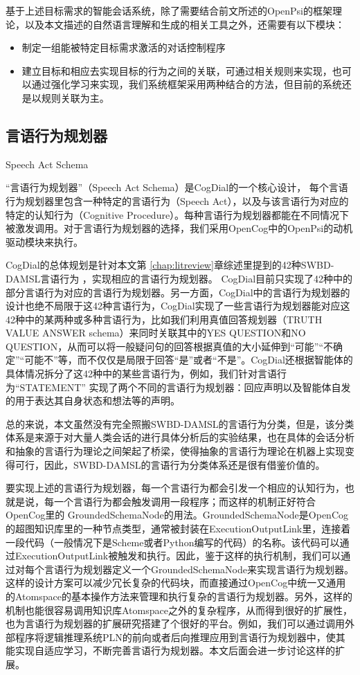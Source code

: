 基于上述目标需求的智能会话系统，除了需要结合前文所述的OpenPsi的框架理论，以及本文描述的自然语言理解和生成的相关工具之外，还需要有以下模块：
\begin{itemize}
\item 制定一组能被特定目标需求激活的对话控制程序
\item 建立目标和相应去实现目标的行为之间的关联，可通过相关规则来实现，也可以通过强化学习来实现，我们系统框架采用两种结合的方法，但目前的系统还是以规则关联为主。
\end{itemize}
  

\subsection {言语行为规划器}{Speech Act Schema}
\label{sec:SAS}

“言语行为规划器”（Speech Act Schema）是CogDial的一个核心设计， 每个言语行为规划器里包含一种特定的言语行为（Speech Act），以及与该言语行为对应的特定的认知行为（Cognitive Procedure）。每种言语行为规划器都能在不同情况下被激发调用。对于言语行为规划器的选择，我们采用OpenCog中的OpenPsi的动机驱动模块来执行。

    CogDial的总体规划是针对本文第 \ref{chap:litreview}章综述里提到的42种SWBD-DAMSL言语行为 \cite{Twitchell2004}，实现相应的言语行为规划器。 CogDial目前只实现了42种中的部分言语行为对应的言语行为规划器。另一方面，CogDial中的言语行为规划器的设计也绝不局限于这42种言语行为，CogDial实现了一些言语行为规划器能对应这42种中的某两种或多种言语行为，比如我们利用真值回答规划器（TRUTH VALUE ANSWER schema）来同时关联其中的YES QUESTION和NO QUESTION，从而可以将一般疑问句的回答根据真值的大小延伸到“可能”“不确定”“可能不”等，而不仅仅是局限于回答“是”或者“不是”。CogDial还根据智能体的具体情况拆分了这42种中的某些言语行为，例如，我们针对言语行为“STATEMENT” 实现了两个不同的言语行为规划器：回应声明以及智能体自发的用于表达其自身状态和想法等的声明。

总的来说，本文虽然没有完全照搬SWBD-DAMSL的言语行为分类，但是，该分类体系是来源于对大量人类会话的进行具体分析后的实验结果，也在具体的会话分析和抽象的言语行为理论之间架起了桥梁，使得抽象的言语行为理论在机器上实现变得可行，因此，SWBD-DAMSL的言语行为分类体系还是很有借鉴价值的。

要实现上述的言语行为规划器，每一个言语行为都会引发一个相应的认知行为，也就是说，每一个言语行为都会触发调用一段程序；而这样的机制正好符合OpenCog里的 GroundedSchemaNode的用法。GroundedSchemaNode是OpenCog的超图知识库里的一种节点类型，通常被封装在ExecutionOutputLink里，连接着一段代码（一般情况下是Scheme或者Python编写的代码）的名称。该代码可以通过ExecutionOutputLink被触发和执行。因此，鉴于这样的执行机制，我们可以通过对每个言语行为规划器定义一个GroundedSchemaNode来实现言语行为规划器。这样的设计方案可以减少冗长复杂的代码块，而直接通过OpenCog中统一又通用的Atomspace的基本操作方法来管理和执行复杂的言语行为规划器。另外，这样的机制也能很容易调用知识库Atomspace之外的复杂程序，从而得到很好的扩展性，也为言语行为规划器的扩展研究搭建了个很好的平台。例如，我们可以通过调用外部程序将逻辑推理系统PLN的前向或者后向推理应用到言语行为规划器中，使其能实现自适应学习，不断完善言语行为规划器。本文后面会进一步讨论这样的扩展。

